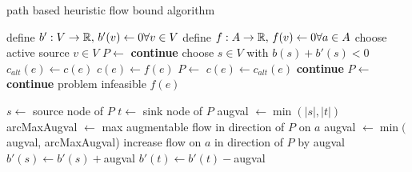 \begin{algorithm}
 \caption{path based heuristic flow bound algorithm}
\label{algo:pathHeur}
 \begin{algorithmic}[5]%
    \State define $b':V\to \mathbb{R},\, b'(v)\gets 0 \forall v\in V$ 
    \State define $f: A\to\mathbb{R},\, f(v)\gets 0 \forall a\in A$
      \State choose active source $v\in V$ 
	\State $P\gets $
	  \State {}\label{heur:lineAugCase1}
	  \State \textbf{continue}
	\EndIf
      \EndIf
	\State choose $s\in V$ with $b(s)+b'(s)<0$
	\State $c_{alt}(e)\gets c(e)$
	\State $c(e)\gets f(e)$
	\State $P\gets$
	\State $c(e)\gets c_{alt}(e)$
	  \State {}\label{heur:lineAugCase2}
	  \State \textbf{continue}
	\Else
	  \State $P\gets$ 
	    \State {}\label{heur:lineAugCase3}
	    \State \textbf{continue}
	  \Else
	    \State \Return problem infeasible
	  \EndIf
	\EndIf
    \EndWhile
    \State \Return $f(e)$
  \EndFunction
 \end{algorithmic}

\end{algorithm}

\begin{algorithm}
 \begin{algorithmic}
    \State $s \gets $ source node of $P$
    \State $t \gets $ sink node of $P$
    \State augval $\gets \min(|s|,|t|)$
      \State arcMaxAugval $\gets$ max augmentable flow in direction of $P$ on $a$ 
      \State augval $\gets \min($augval, arcMaxAugval)
    \EndFor
      \State increase flow on $a$ in direction of $P$ by augval
    \EndFor
    \State $b'(s) \gets b'(s) + $augval
    \State $b'(t) \gets b'(t) - $augval
  \EndFunction
 \end{algorithmic}
 
\end{algorithm}

